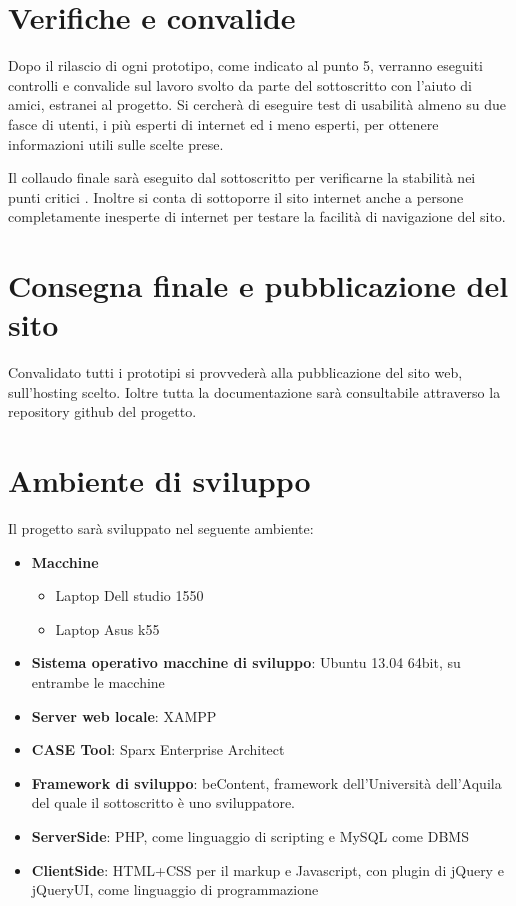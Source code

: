\documentclass[a4paper,12pt,hidelinks]{report}
\begin{document}
\section{Verifiche e convalide}
Dopo il rilascio di ogni prototipo, come indicato al punto 5, verranno eseguiti controlli e convalide sul lavoro svolto da parte del sottoscritto con l'aiuto di amici, estranei
al progetto. Si cercherà di eseguire test di usabilità almeno su due fasce di utenti, i più esperti di internet ed i meno esperti, per ottenere informazioni utili
sulle scelte prese.
\par Il collaudo finale sarà eseguito dal sottoscritto per verificarne la stabilità nei punti critici . Inoltre si conta di sottoporre il sito internet anche a persone
completamente inesperte di internet per testare la facilità di navigazione del sito.

\section{Consegna finale e pubblicazione del sito}
Convalidato tutti i prototipi si provvederà alla pubblicazione del sito web, sull'hosting scelto. Ioltre tutta la documentazione sarà consultabile attraverso la repository
github del progetto.

\section{Ambiente di sviluppo}
Il progetto sarà sviluppato nel seguente ambiente:
\begin{itemize}
 \item \textbf{Macchine}
  \begin{itemize}
    \item Laptop Dell studio 1550 
    \item Laptop Asus k55
  \end{itemize}
 \item \textbf{Sistema operativo macchine di sviluppo}: Ubuntu 13.04 64bit, su entrambe le macchine
 \item \textbf{Server web locale}: XAMPP
 \item \textbf{CASE Tool}: Sparx Enterprise Architect
 \item \textbf{Framework di sviluppo}: beContent, framework dell'Università dell'Aquila del quale il sottoscritto è uno sviluppatore.
 \item \textbf{ServerSide}: PHP, come linguaggio di scripting e MySQL come DBMS
 \item \textbf{ClientSide}: HTML+CSS per il markup e Javascript, con plugin di jQuery e jQueryUI, come linguaggio di programmazione
\end{itemize}
\end{document}
